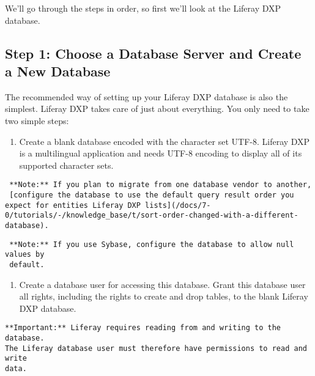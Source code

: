 We'll go through the steps in order, so first we'll look at the Liferay
DXP database.

\subsection{Step 1: Choose a Database Server and Create a New
Database}\label{step-1-choose-a-database-server-and-create-a-new-database}

The recommended way of setting up your Liferay DXP database is also the
simplest. Liferay DXP takes care of just about everything. You only need
to take two simple steps:

\begin{enumerate}
\def\labelenumi{\arabic{enumi}.}
\tightlist
\item
  Create a blank database encoded with the character set UTF-8. Liferay
  DXP is a multilingual application and needs UTF-8 encoding to display
  all of its supported character sets.
\end{enumerate}

\noindent\hrulefill

\begin{verbatim}
 **Note:** If you plan to migrate from one database vendor to another,
 [configure the database to use the default query result order you expect for entities Liferay DXP lists](/docs/7-0/tutorials/-/knowledge_base/t/sort-order-changed-with-a-different-database).
\end{verbatim}

\noindent\hrulefill

\noindent\hrulefill

\begin{verbatim}
 **Note:** If you use Sybase, configure the database to allow null values by
 default.
\end{verbatim}

\noindent\hrulefill

\begin{enumerate}
\def\labelenumi{\arabic{enumi}.}
\setcounter{enumi}{1}
\tightlist
\item
  Create a database user for accessing this database. Grant this
  database user all rights, including the rights to create and drop
  tables, to the blank Liferay DXP database.
\end{enumerate}

\noindent\hrulefill

\begin{verbatim}
**Important:** Liferay requires reading from and writing to the database.
The Liferay database user must therefore have permissions to read and write
data.
\end{verbatim}

